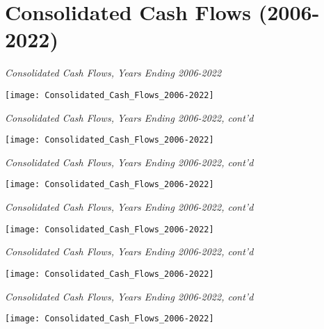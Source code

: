 
\chapter{Consolidated Cash Flows (2006-2022)}
\label{ch:consolidated_cash_flows_2010-22}

\begin{sidewaystable}
  \caption[Consolidated Cash Flows, Years Ending 2006–2022]{\textit{Consolidated Cash Flows, Years Ending 2006-2022}}%
  \label{tab:consolidated_cash_flows} %
  \texttt{[image: Consolidated\_Cash\_Flows\_2006-2022]} %
\end{sidewaystable}

\begin{sidewaystable}
  \caption*{\textit{Consolidated Cash Flows, Years Ending 2006-2022, cont'd}}
  \texttt{[image: Consolidated\_Cash\_Flows\_2006-2022]} %
\end{sidewaystable}

\begin{sidewaystable}
  \caption*{\textit{Consolidated Cash Flows, Years Ending 2006-2022, cont'd}}
  \texttt{[image: Consolidated\_Cash\_Flows\_2006-2022]} %
\end{sidewaystable}

\begin{sidewaystable}

  \caption*{\textit{Consolidated Cash Flows, Years Ending 2006-2022, cont'd}}
  \texttt{[image: Consolidated\_Cash\_Flows\_2006-2022]} %
\end{sidewaystable}

\begin{sidewaystable}

  \caption*{\textit{Consolidated Cash Flows, Years Ending 2006-2022, cont'd}}
  \texttt{[image: Consolidated\_Cash\_Flows\_2006-2022]} %
\end{sidewaystable}

\begin{sidewaystable}

  \caption*{\textit{Consolidated Cash Flows, Years Ending 2006-2022, cont'd}}
  \texttt{[image: Consolidated\_Cash\_Flows\_2006-2022]} %
\end{sidewaystable}

